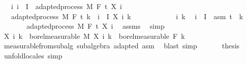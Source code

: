 \begin{isabellebody}
\ \ \ {\isachardoublequoteopen}{\isasymAnd}i{\isachardot}{\kern0pt}\ i\ {\isasymin}\ I\ {\isasymLongrightarrow}\ adapted{\isacharunderscore}{\kern0pt}process\ M\ F\ t\ {\isacharparenleft}{\kern0pt}X\ i{\isacharparenright}{\kern0pt}{\isachardoublequoteclose}\isanewline
\ \ \ {\isachardoublequoteopen}adapted{\isacharunderscore}{\kern0pt}process\ M\ F\ t\ {\isacharparenleft}{\kern0pt}{\isasymlambda}k\ {\isasymxi}{\isachardot}{\kern0pt}\ {\isasymSum}i\ {\isasymin}\ I{\isachardot}{\kern0pt}\ X\ i\ k\ {\isasymxi}{\isacharparenright}{\kern0pt}{\isachardoublequoteclose}\ \isanewline
%
\isadelimproof
%
\endisadelimproof
%
\isatagproof
{}\isamarkupfalse%
\ {\isacharminus}{\kern0pt}\isanewline
\ \ \isacommand{{\isacharbraceleft}{\kern0pt}}\isamarkupfalse%
\isanewline
\ \ \ \ \isamarkupfalse%
\ i\ k\ \isamarkupfalse%
\ {\isachardoublequoteopen}i\ {\isasymin}\ I{\isachardoublequoteclose}\ \ asm{\isacharcolon}{\kern0pt}\ {\isachardoublequoteopen}t\ {\isasymle}\ k{\isachardoublequoteclose}\isanewline
\ \ \ \ \isamarkupfalse%
\ \isamarkupfalse%
\ adapted{\isacharunderscore}{\kern0pt}process\ M\ F\ t\ {\isachardoublequoteopen}X\ i{\isachardoublequoteclose}\ \isamarkupfalse%
\ assms\ \isamarkupfalse%
\ simp\isanewline
\ \ \ \ \isamarkupfalse%
\ {\isachardoublequoteopen}X\ i\ k\ {\isasymin}\ borel{\isacharunderscore}{\kern0pt}measurable\ M{\isachardoublequoteclose}\ {\isachardoublequoteopen}X\ i\ k\ {\isasymin}\ borel{\isacharunderscore}{\kern0pt}measurable\ {\isacharparenleft}{\kern0pt}F\ k{\isacharparenright}{\kern0pt}{\isachardoublequoteclose}\ \isamarkupfalse%
\ measurable{\isacharunderscore}{\kern0pt}from{\isacharunderscore}{\kern0pt}subalg\ subalgebra\ adapted\ asm\ \isamarkupfalse%
\ {\isacharparenleft}{\kern0pt}blast{\isacharcomma}{\kern0pt}\ simp{\isacharparenright}{\kern0pt}\isanewline
\ \ \isacommand{{\isacharbraceright}{\kern0pt}}\isamarkupfalse%
\isanewline
\ \ \isamarkupfalse%
\ {\isacharquery}{\kern0pt}thesis\ \isamarkupfalse%
\ {\isacharparenleft}{\kern0pt}unfold{\isacharunderscore}{\kern0pt}locales{\isacharparenright}{\kern0pt}\ simp\isanewline
{}\isamarkupfalse%
%
\endisatagproof
{\isafoldproof}%
%
\isadelimproof
%
\endisadelimproof
%
\begin{isamarkuptext}%

\end{isamarkuptext}
\end{isabellebody}
